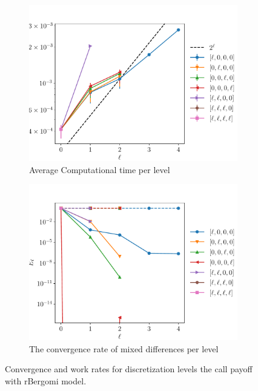 \documentclass[11pt]{article}
\begin{document}
\begin{figure}[!h]
	\centering
	\begin{subfigure}{.5\textwidth}
		\centering
		\includegraphics[width=0.95\linewidth]{./figures/rbergomi_2_steps_K_e__4/level_work.pdf}
		\caption{Average Computational time per level}
		\label{fig:misc_rbergomi_2_steps_sub3}
	\end{subfigure}%
	\begin{subfigure}{.5\textwidth}
		\centering
		\includegraphics[width=0.95\linewidth]{./figures/rbergomi_2_steps_K_e__4/levels_error_rate.pdf}
		\caption{ The convergence rate of mixed differences per level}
		\label{fig:misc_rbergomi_2_steps_sub4}
	\end{subfigure}%
	\caption{Convergence and work rates for discretization levels  the call payoff with rBergomi model.}
	\label{fig:misc_rbergomi_2_steps_2}
\end{figure}
\newpage
\end{document}
